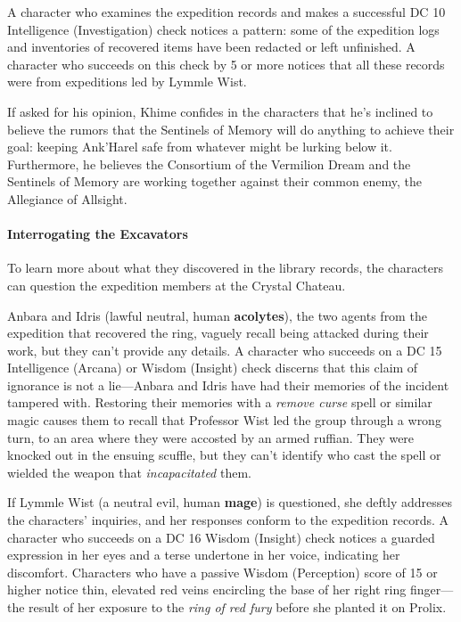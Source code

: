 \documentclass[a4paper, 11pt, bg=full, twocolumn, nooutline]{dndbook}
\begin{document}
A character who examines the expedition records and makes a successful DC 10 Intelligence (Investigation) check notices a pattern: some of the expedition logs and inventories of recovered items have been redacted or left unfinished. A character who succeeds on this check by 5 or more notices that all these records were from expeditions led by Lymmle Wist.

If asked for his opinion, Khime confides in the characters that he's inclined to believe the rumors that the Sentinels of Memory will do anything to achieve their goal: keeping Ank'Harel safe from whatever might be lurking below it. Furthermore, he believes the Consortium of the Vermilion Dream and the Sentinels of Memory are working together against their common enemy, the Allegiance of Allsight.

\paragraph{Interrogating the Excavators}

To learn more about what they discovered in the library records, the characters can question the expedition members at the Crystal Chateau.

Anbara and Idris (lawful neutral, human \textbf{acolytes}), the two agents from the expedition that recovered the ring, vaguely recall being attacked during their work, but they can't provide any details. A character who succeeds on a DC 15 Intelligence (Arcana) or Wisdom (Insight) check discerns that this claim of ignorance is not a lie---Anbara and Idris have had their memories of the incident tampered with. Restoring their memories with a \textit{remove curse} spell or similar magic causes them to recall that Professor Wist led the group through a wrong turn, to an area where they were accosted by an armed ruffian. They were knocked out in the ensuing scuffle, but they can't identify who cast the spell or wielded the weapon that \textit{incapacitated} them.

If Lymmle Wist (a neutral evil, human \textbf{mage}) is questioned, she deftly addresses the characters' inquiries, and her responses conform to the expedition records. A character who succeeds on a DC 16 Wisdom (Insight) check notices a guarded expression in her eyes and a terse undertone in her voice, indicating her discomfort. Characters who have a passive Wisdom (Perception) score of 15 or higher notice thin, elevated red veins encircling the base of her right ring finger---the result of her exposure to the \textit{ring of red fury} before she planted it on Prolix.
\end{document}

